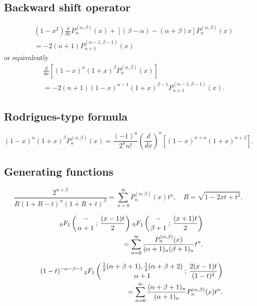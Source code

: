 \documentclass[envcountchap,graybox]{svmono}
\newcommand{\hyp}[5]{\mbox{}_{#1}{F}_{#2}
\left(\genfrac{}{}{0pt}{}{#3}{#4}\,;\,#5\right)}
\begin{document}
\subsection*{Backward shift operator}
\begin{eqnarray}
\label{shift2JacobiI}
& &(1-x^2)\frac{d}{dx}P_n^{(\alpha,\beta)}(x)+
\left[(\beta-\alpha)-(\alpha+\beta)x\right]P_n^{(\alpha,\beta)}(x)\nonumber\\
& &{}=-2(n+1)P_{n+1}^{(\alpha-1,\beta-1)}(x)
\end{eqnarray}
or equivalently
\begin{eqnarray}
\label{shift2JacobiII}
& &\frac{d}{dx}\left[(1-x)^\alpha(1+x)^\beta P_n^{(\alpha,\beta)}(x)\right]\nonumber\\
& &{}=-2(n+1)(1-x)^{\alpha-1}(1+x)^{\beta-1}P_{n+1}^{(\alpha-1,\beta-1)}(x).
\end{eqnarray}

\subsection*{Rodrigues-type formula}
\begin{equation}
\label{RodJacobi}
(1-x)^{\alpha}(1+x)^{\beta}P_n^{(\alpha,\beta)}(x)=
\frac{(-1)^n}{2^nn!}\left(\frac{d}{dx}\right)^n
\left[(1-x)^{n+\alpha}(1+x)^{n+\beta}\right].
\end{equation}

\subsection*{Generating functions}
\begin{equation}
\label{GenJacobi1}
\frac{2^{\alpha+\beta}}{R(1+R-t)^{\alpha}(1+R+t)^{\beta}}=
\sum_{n=0}^{\infty}P_n^{(\alpha,\beta)}(x)t^n,\quad R=\sqrt{1-2xt+t^2}.
\end{equation}

\begin{eqnarray}
\label{GenJacobi2}
& &\hyp{0}{1}{-}{\alpha+1}{\frac{(x-1)t}{2}}\,\hyp{0}{1}{-}{\beta+1}{\frac{(x+1)t}{2}}\nonumber\\
& &{}=\sum_{n=0}^{\infty}\frac{P_n^{(\alpha,\beta)}(x)}{(\alpha+1)_n(\beta+1)_n}t^n.
\end{eqnarray}

\begin{eqnarray}
\label{GenJacobi3}
& &(1-t)^{-\alpha-\beta-1}\,\hyp{2}{1}{\frac{1}{2}(\alpha+\beta+1),\frac{1}{2}(\alpha+\beta+2)}
{\alpha+1}{\frac{2(x-1)t}{(1-t)^2}}\nonumber\\
& &{}=\sum_{n=0}^{\infty}\frac{(\alpha+\beta+1)_n}{(\alpha+1)_n}P_n^{(\alpha,\beta)}(x)t^n.
\end{eqnarray}
\end{document}
